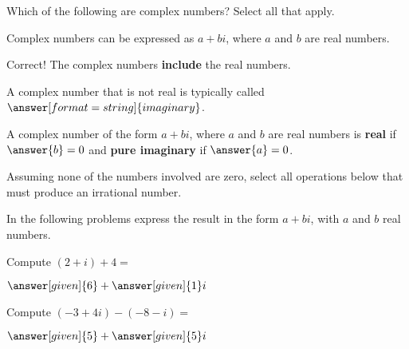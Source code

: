 \documentclass[nooutcomes]{ximera}
\begin{document}
\begin{problem}
Which of the following are complex numbers?  Select all that apply.

\begin{selectAll}
\end{selectAll}
\begin{hint}
Complex numbers can be expressed as $a+bi$, where $a$ and $b$ are real numbers.  
\end{hint}
\begin{problem}
Correct! The complex numbers \textbf{include} the real numbers.

A complex number that is not real is typically called 
$\answer[format=string]{imaginary}$. 

A complex number of the form $a+bi$, where $a$ and $b$ are real numbers is \textbf{real} if $\answer{b}=0$ and 
\textbf{pure imaginary} if $\answer{a}=0$.  
\end{problem}
\end{problem}


\begin{problem}
Assuming none of the numbers involved are zero, select all operations below that must produce an irrational number.

\begin{selectAll}
\end{selectAll}
\end{problem}

In the following problems express the result in the form $a+bi$, with $a$ and $b$ real numbers.  

\begin{problem}
Compute $(2+i) + 4 = $ 
\begin{prompt}
	$\answer[given]{6} + \answer[given]{1}i$
\end{prompt}
\end{problem}


\begin{problem}
Compute $(-3+4i) - (-8 - i) =$
\begin{prompt}
	$\answer[given]{5} + \answer[given]{5}i$
\end{prompt}
\end{problem}
\end{document}

